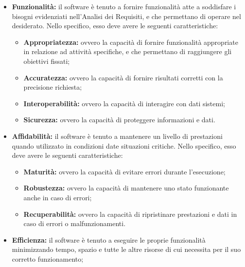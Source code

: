 \documentclass[openany,12pt,a4paper]{report}
\begin{document}
\begin{itemize}
    \item \textbf{Funzionalità:} il software è tenuto a fornire funzionalità atte a soddisfare i bisogni evidenziati nell'Analisi dei Requisiti, e che permettano di operare nel  desiderato. Nello specifico, esso deve avere le seguenti caratteristiche:

    \begin{itemize}
        \item \textbf{Appropriatezza:} ovvero la capacità di fornire funzionalità appropriate in relazione ad attività specifiche, e che permettano di raggiungere gli obiettivi fissati;
        
        \item \textbf{Accuratezza:} ovvero la capacità di fornire risultati corretti con la precisione richiesta;
        
        \item \textbf{Interoperabilità:} ovvero la capacità di interagire con dati sistemi;
        
        \item \textbf{Sicurezza:} ovvero la capacità di proteggere informazioni e dati.
    \end{itemize}
    
    \item \textbf{Affidabilità:} il software è tenuto a mantenere un livello di prestazioni quando utilizzato in condizioni date situazioni critiche. Nello specifico, esso deve avere le seguenti caratteristiche:

    \begin{itemize}
        \item \textbf{Maturità:} ovvero la capacità di evitare errori durante l'esecuzione;
        
        \item \textbf{Robustezza:} ovvero la capacità di mantenere uno stato funzionante anche in caso di errori;
        
        \item \textbf{Recuperabilità:} ovvero la capacità di ripristinare prestazioni e dati in caso di errori o malfunzionamenti.
    \end{itemize}

    \item \textbf{Efficienza:} il software è tenuto a eseguire le proprie funzionalità minimizzando tempo, spazio e tutte le altre risorse di cui necessita per il suo corretto funzionamento;
    

\end{itemize}
\end{document}
